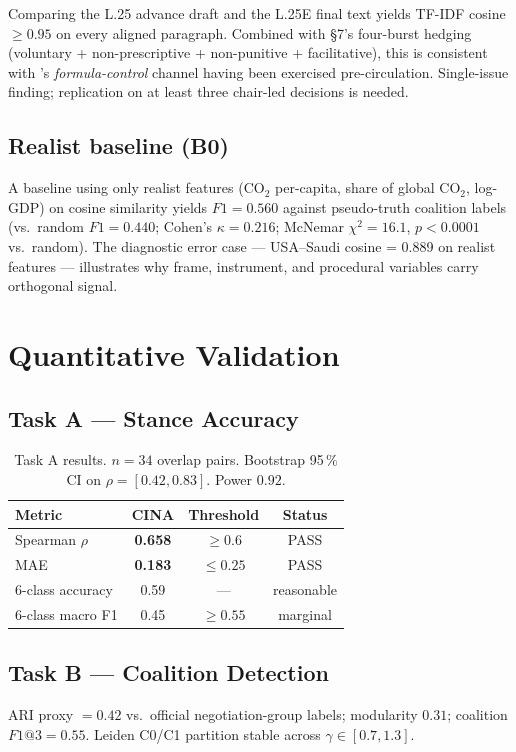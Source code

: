 \documentclass[11pt,a4paper]{article}
\begin{document}
Comparing the L.25 advance draft and the L.25E final text yields TF-IDF cosine $\geq 0.95$ on every aligned paragraph. Combined with §7's four-burst hedging (voluntary + non-prescriptive + non-punitive + facilitative), this is consistent with \citet{tallberg2010}'s \emph{formula-control} channel having been exercised pre-circulation. Single-issue finding; replication on at least three chair-led decisions is needed.

\subsection{Realist baseline (B0)}

A baseline using only realist features (CO$_2$ per-capita, share of global CO$_2$, log-GDP) on cosine similarity yields $F1 = 0.560$ against pseudo-truth coalition labels (vs.\ random $F1 = 0.440$; Cohen's $\kappa = 0.216$; McNemar $\chi^2 = 16.1$, $p < 0.0001$ vs.\ random). The diagnostic error case --- USA--Saudi cosine = 0.889 on realist features --- illustrates why frame, instrument, and procedural variables carry orthogonal signal.

\section{Quantitative Validation}
\label{sec:eval}

\subsection{Task A --- Stance Accuracy}

\begin{table}[ht]
\centering
\small
\begin{tabular}{lccc}
\toprule
Metric & CINA & Threshold & Status \\ \midrule
Spearman $\rho$ & \textbf{0.658} & $\geq 0.6$ & PASS \\
MAE & \textbf{0.183} & $\leq 0.25$ & PASS \\
6-class accuracy & 0.59 & --- & reasonable \\
6-class macro F1 & 0.45 & $\geq 0.55$ & marginal \\
\bottomrule
\end{tabular}
\caption{Task A results. $n=34$ overlap pairs. Bootstrap 95\,\% CI on $\rho = [0.42, 0.83]$. Power $0.92$.}
\end{table}

\subsection{Task B --- Coalition Detection}
ARI proxy $= 0.42$ vs.\ official negotiation-group labels; modularity $0.31$; coalition $F1@3 = 0.55$. Leiden C0/C1 partition stable across $\gamma \in [0.7, 1.3]$.
\end{document}
